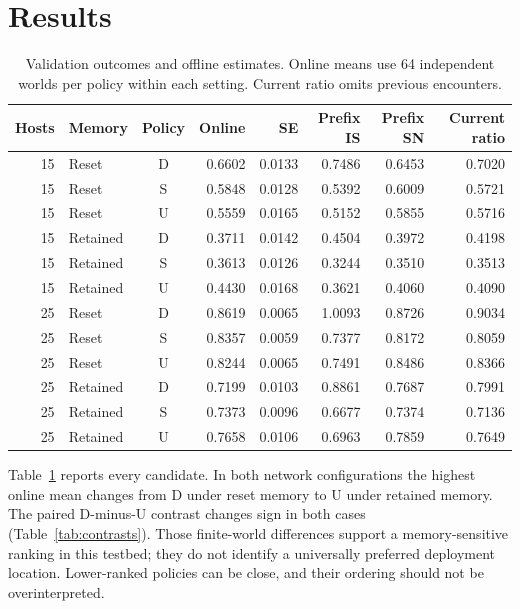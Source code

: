 \documentclass[sigconf,nonacm]{acmart}
\begin{document}
\section{Results}
\begin{table}[t]
\centering\small
\setlength{\tabcolsep}{3pt}
\caption{Validation outcomes and offline estimates. Online means use 64 independent worlds per policy within each setting. Current ratio omits previous encounters.}\label{tab:results}
\begin{tabular}{rlcrrrrr}\toprule
Hosts & Memory & Policy & Online & SE & Prefix IS & Prefix SN & Current ratio\\ \midrule
15 & Reset & D & 0.6602 & 0.0133 & 0.7486 & 0.6453 & 0.7020 \\
15 & Reset & S & 0.5848 & 0.0128 & 0.5392 & 0.6009 & 0.5721 \\
15 & Reset & U & 0.5559 & 0.0165 & 0.5152 & 0.5855 & 0.5716 \\
15 & Retained & D & 0.3711 & 0.0142 & 0.4504 & 0.3972 & 0.4198 \\
15 & Retained & S & 0.3613 & 0.0126 & 0.3244 & 0.3510 & 0.3513 \\
15 & Retained & U & 0.4430 & 0.0168 & 0.3621 & 0.4060 & 0.4090 \\
25 & Reset & D & 0.8619 & 0.0065 & 1.0093 & 0.8726 & 0.9034 \\
25 & Reset & S & 0.8357 & 0.0059 & 0.7377 & 0.8172 & 0.8059 \\
25 & Reset & U & 0.8244 & 0.0065 & 0.7491 & 0.8486 & 0.8366 \\
25 & Retained & D & 0.7199 & 0.0103 & 0.8861 & 0.7687 & 0.7991 \\
25 & Retained & S & 0.7373 & 0.0096 & 0.6677 & 0.7374 & 0.7136 \\
25 & Retained & U & 0.7658 & 0.0106 & 0.6963 & 0.7859 & 0.7649 \\
\bottomrule\end{tabular}
\end{table}
Table~\ref{tab:results} reports every candidate. In both network configurations the highest online mean changes from D under reset memory to U under retained memory. The paired D-minus-U contrast changes sign in both cases (Table~\ref{tab:contrasts}). Those finite-world differences support a memory-sensitive ranking in this testbed; they do not identify a universally preferred deployment location. Lower-ranked policies can be close, and their ordering should not be overinterpreted.
\end{document}
